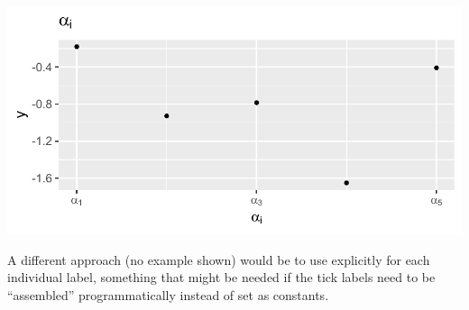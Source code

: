\documentclass[krantz2]{krantz}\usepackage{knitr}
\begin{document}
\begin{knitrout}\footnotesize
{}\color{fgcolor}\begin{kframe}
\begin{alltt}
 \hlkwb{<-} 
  \hlopt{+}
   \hlstd{()} \hlopt{+}
   \hlstd{(} \hlstd{=} \hlstd{(}  \hlopt{+}
   \hlstd{(} \hlstd{=} 
                       \hlstd{=} \hlstd{(}\hlstd{,}\hlstd{,}\hlstd{),}
                       \hlstd{=} \hlstd{(alpha[}\hlstd{], alpha[}\hlstd{], alpha[}\hlstd{]))}
\end{alltt}
\end{kframe}

{\centering \includegraphics[width=.7\textwidth]{figure/pos-plotmath-02a-1} 

}



\end{knitrout}

A different approach (no example shown) would be to use  explicitly for each individual label, something that might be needed if the tick labels need to be ``assembled'' programmatically instead of set as constants.
\end{document}
